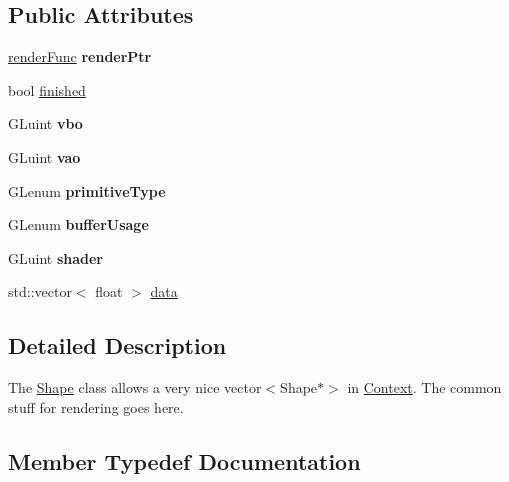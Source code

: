 \subsection*{Public Attributes}
\begin{DoxyCompactItemize}
\item 
\hypertarget{classShape_a016f40915d3586c308b3e8fdfb9d9bc5}{}\hyperlink{classShape_ab0227d9b119beea793bce34ba3e0b5b8}{render\+Func} {\bfseries render\+Ptr}\label{classShape_a016f40915d3586c308b3e8fdfb9d9bc5}

\item 
bool \hyperlink{classShape_ad766ebc1fafeb7f6c76d37ccfed88be4}{finished}
\item 
\hypertarget{classShape_a9772bed5d7baa4d326238e0abdc9d902}{}G\+Luint {\bfseries vbo}\label{classShape_a9772bed5d7baa4d326238e0abdc9d902}

\item 
\hypertarget{classShape_ab0690d5f4e6d3de615e90002bc3913c7}{}G\+Luint {\bfseries vao}\label{classShape_ab0690d5f4e6d3de615e90002bc3913c7}

\item 
\hypertarget{classShape_ad05ed5f7c01b7d0ee1b8e5a5400aa2b7}{}G\+Lenum {\bfseries primitive\+Type}\label{classShape_ad05ed5f7c01b7d0ee1b8e5a5400aa2b7}

\item 
\hypertarget{classShape_a9203986d2f0e566c7cf66be7478eca59}{}G\+Lenum {\bfseries buffer\+Usage}\label{classShape_a9203986d2f0e566c7cf66be7478eca59}

\item 
\hypertarget{classShape_ae5913f51b7905a468357f5e675a6f4fd}{}G\+Luint {\bfseries shader}\label{classShape_ae5913f51b7905a468357f5e675a6f4fd}

\item 
std\+::vector$<$ float $>$ \hyperlink{classShape_a540c062d8d9719147efb7723ce0ceeea}{data}
\end{DoxyCompactItemize}


\subsection{Detailed Description}
The \hyperlink{classShape}{Shape} class allows a very nice vector$<$\+Shape$\ast$$>$ in \hyperlink{classContext}{Context}. The common stuff for rendering goes here. 

\subsection{Member Typedef Documentation}
\hypertarget{classShape_ab0227d9b119beea793bce34ba3e0b5b8}{}
